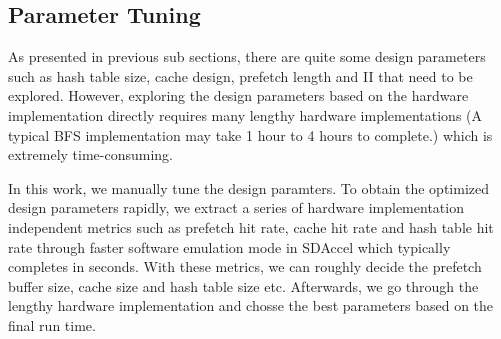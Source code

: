\subsection{Parameter Tuning}
As presented in previous sub sections, there are quite some design 
parameters such as hash table size, cache design, prefetch 
length and II that need to be explored. However, exploring the design parameters 
based on the hardware implementation directly requires many lengthy 
hardware implementations (A typical BFS implementation may 
take 1 hour to 4 hours to complete.) which is extremely time-consuming.

In this work, we manually tune the design paramters. To obtain the optimized 
design parameters rapidly, we extract a series of hardware implementation independent 
metrics such as prefetch hit rate, cache hit rate and hash table hit rate 
through faster software emulation mode in SDAccel which typically completes in seconds.
With these metrics, we can roughly decide the prefetch buffer size, 
cache size and hash table size etc. Afterwards, we go through the lengthy 
hardware implementation and chosse the best parameters based on the final 
run time. 

%
%
%



